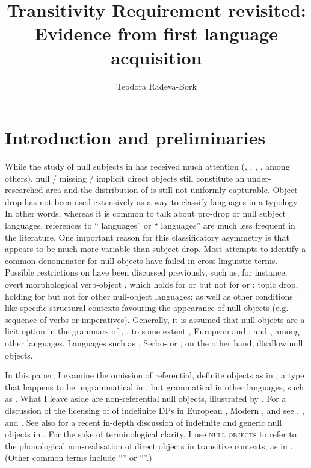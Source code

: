 \documentclass[output=paper,modfonts,newtxmath,hidelinks,]{langscibook}
\title{Transitivity Requirement revisited: Evidence from first language acquisition}
\author{Teodora Radeva-Bork\affiliation{University of Potsdam}}
\begin{document}
\maketitle
{}

\section{Introduction and preliminaries}\label{17:sec:key:1}

While the study of null subjects in  has received much attention (\citealt{Franks1995}, \citealt{Lindseth1998}, \citealt{Fehrmann-Junghanns2008}, \citealt{Müller2006}, among others), null / missing / implicit direct objects still constitute an under-researched area and the distribution of  is still not uniformly capturable. Object drop has not been used extensively as a way to classify languages in a typology. In other words, whereas it is common to talk about pro-drop or null subject languages, references to “ languages” or “ languages” are much less frequent in the literature. One important reason for this classificatory asymmetry is that  appears to be much more variable than subject drop. Most attempts to identify a common denominator for null objects have failed in cross-linguistic terms. Possible restrictions on  have been discussed previously, such as, for instance, overt morphological verb-object , which holds for  or  but not for  or ; topic drop, holding for  but not for other null-object languages; as well as other conditions like specific structural contexts favouring the appearance of null objects (e.g. sequence of verbs or imperatives). Generally, it is assumed that null objects are a licit option in the grammars of , , to some extent , European and , and , among other languages. Languages such as , Serbo- or , on the other hand, disallow null objects.

In this paper, I examine the omission of referential, definite objects as in , a type that happens to be ungrammatical in  , but grammatical in other languages, such as  . What I leave aside are non-referential null objects, illustrated by . For a discussion of the licensing of  of indefinite DPs in European , Modern , and  see \citet{Campos1986}, \citet{Giannakidou-Merchant1997}, and \citet{Dimitriadis1994}. See also \citet{dvorak17} for a recent in-depth discussion of indefinite and generic null objects in . For the sake of terminological clarity, I use \textsc{null objects} to refer to the phonological non-realisation of direct objects in transitive contexts, as in . (Other common terms include “” or “”.)
\end{document}
